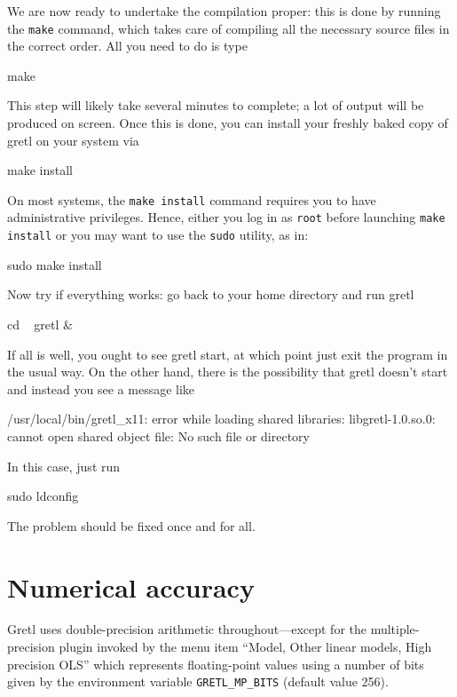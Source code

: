 We are now ready to undertake the compilation proper: this is done by
running the \texttt{make} command, which takes care of compiling all
the necessary source files in the correct order. All you need to do is
type
\begin{code}
make 
\end{code}

This step will likely take several minutes to complete; a lot of
output will be produced on screen. Once this is done, you can install
your freshly baked copy of gretl on your system via
\begin{code}
make install
\end{code}

On most systems, the \texttt{make install} command requires you to
have administrative privileges.  Hence, either you log in as
\texttt{root} before launching \texttt{make install} or you may want
to use the \texttt{sudo} utility, as in:
\begin{code}
sudo make install
\end{code}

Now try if everything works: go back to your home directory and run gretl
\begin{code}
cd ~
gretl &
\end{code}

If all is well, you ought to see gretl start, at which point just exit
the program in the usual way. On the other hand, there is the
possibility that gretl doesn't start and instead you see a message
like

\begin{code}
   /usr/local/bin/gretl_x11: error while loading shared libraries:
   libgretl-1.0.so.0: cannot open shared object file: No such file or directory
\end{code}

In this case, just run
\begin{code}
  sudo ldconfig
\end{code}
The problem should be fixed once and for all.

\chapter{Numerical accuracy}
\label{app-accuracy}

Gretl uses double-precision arithmetic throughout---except for
the multiple-precision plugin invoked by the menu item ``Model, Other
linear models, High precision OLS'' which represents floating-point
values using a number of bits given by the environment variable
\verb+GRETL_MP_BITS+ (default value 256).  

